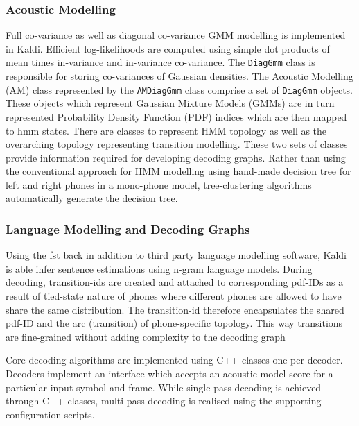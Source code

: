 \subsubsection{Acoustic Modelling}
Full co-variance as well as diagonal co-variance GMM modelling is implemented in Kaldi. Efficient log-likelihoods are computed using simple dot products of mean times in-variance and in-variance co-variance.  The \texttt{DiagGmm} class is responsible for storing co-variances of Gaussian densities. The Acoustic Modelling (AM) class represented by the \texttt{AMDiagGmm} class comprise a set of \texttt{DiagGmm} objects.  These objects which represent Gaussian Mixture Models (GMMs) are in turn represented Probability Density Function (PDF) indices which are then mapped to \acrfull{hmm} states. There are classes to represent HMM topology as well as the overarching topology representing transition modelling. These two sets of classes provide information required for developing decoding graphs.  Rather than using the conventional approach for HMM modelling using hand-made decision tree for left and right phones in a mono-phone model, tree-clustering algorithms automatically generate the decision tree.

\subsubsection{Language Modelling and Decoding Graphs}
Using the \acrfull{fst} back in addition to third party language modelling software, Kaldi is able infer sentence estimations using n-gram language models. During decoding, transition-ids are created and attached to corresponding pdf-IDs as a result of tied-state nature of phones where different phones are allowed to have share the same distribution.  The transition-id therefore encapsulates the shared pdf-ID and the arc (transition) of phone-specific topology. This way transitions are fine-grained without adding complexity to the decoding graph

Core decoding algorithms are implemented using C++ classes one per decoder.  Decoders implement an interface which accepts an acoustic model score for a particular input-symbol and frame.  While single-pass decoding is achieved through C++ classes, multi-pass decoding is realised using the supporting configuration scripts.

